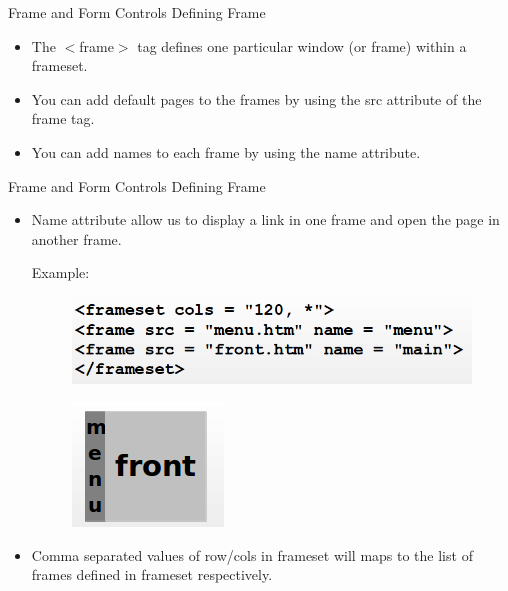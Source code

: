 \documentclass[14pt]{beamer}
\begin{document}
\begin{frame}{Frame and Form Controls}
Defining Frame
\begin{itemize}
 \item The $<$frame$>$ tag defines one particular window (or frame) within a frameset.
 \item You can add default pages to the frames by using the src attribute of the frame tag.
 \item You can add names to each frame by using the name attribute. 
\end{itemize}
\end{frame}

\begin{frame}{Frame and Form Controls}
Defining Frame
\begin{itemize}
 \item Name attribute allow us to display a link in one frame and open the page in another frame.

 Example:
 
\begin{minipage}{5cm}
\begin{figure}[H]
 \includegraphics[scale=.29]{define-frame1.png}
\end{figure}
\end{minipage}
\quad
\begin{minipage}{4cm}
\begin{figure}[H]
\includegraphics[scale=.3]{define-frame2.png}
\end{figure}
\end{minipage}
\item Comma separated values of row/cols in frameset will maps to the list of frames defined in frameset respectively.
\end{itemize}
\end{frame}
\end{document}
